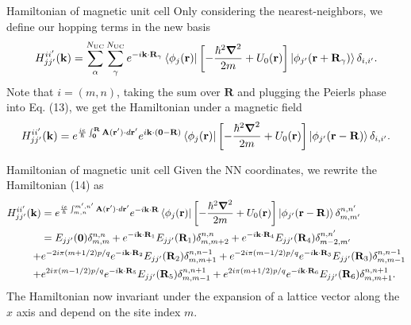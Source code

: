 \documentclass[aspectratio=169,compress,x11names]{beamer}
\begin{document}
	\begin{frame}{Hamiltonian of magnetic unit cell}
		Only considering the nearest-neighbors, we define our hopping terms in the new basis
		\begin{gather}
			H_{jj'}^{ii'}(\mathbf{k}) = \sum_{{\alpha}}^{N_\text{UC}}\sum_{{\gamma}}^{N_\text{UC}} e^{-i \mathbf{k}\cdot \mathbf{R}_{\gamma}} \bra{\phi_{j}(\mathbf{r})} \left[-\frac{\hbar^{2} \boldsymbol{\nabla}^{2}}{2m} + U_{0}(\mathbf{r})\right] \ket{\phi_{j'}(\mathbf{r}+\mathbf{R}_{\gamma})}\delta_{i,i'}.
		\end{gather}
		Note that $i=(m,n)$, taking the sum over $\mathbf{R}$ and plugging the Peierls phase into Eq. (13), we get the Hamiltonian under a magnetic field
		\begin{gather}
			H_{jj'}^{ii'}(\mathbf{k})
			= e^{\frac{ie}{\hbar} \int_{\mathbf{0}}^{\mathbf{R}}\mathbf{A}(\mathbf{r}')\cdot d\mathbf{r}'}e^{i\mathbf{k} \cdot (\mathbf{0} - \mathbf{R})} \bra{\phi_{j}(\mathbf{r})} \left[-\frac{\hbar^{2} \boldsymbol{\nabla}^{2}}{2m} + U_{0}(\mathbf{r})\right] \ket{\phi_{j'}(\mathbf{r} - \mathbf{R})}\delta_{i,i'} .
		\end{gather}
	\end{frame}
	\begin{frame}{Hamiltonian of magnetic unit cell}
		Given the NN coordinates, we rewrite the Hamiltonian (14) as
		\begin{equation}
			\begin{aligned}
				H_{jj'}^{ii'}(\mathbf{k}) 
				&= e^{\frac{ie}{\hbar} \int_{m,n}^{m',n'} \mathbf{A}(\mathbf{r}') \cdot d\mathbf{r}'} e^{-i\mathbf{k} \cdot \mathbf{R}}\bra{\phi_{j}(\mathbf{r})} \left[-\frac{\hbar^{2} \boldsymbol{\nabla}^{2}}{2m} + U_{0}(\mathbf{r})\right] \ket{\phi_{j'}(\mathbf{r} - \mathbf{R})}\delta_{m,m'}^{n,n'}\\
				& = E_{jj'}(\mathbf{0}) \delta_{m,m}^{n,n} + e^{-i\mathbf{k} \cdot \mathbf{R}_{1}}E_{jj'}(\mathbf{R}_{1}) \delta_{m,m+2}^{n,n} + e^{-i\mathbf{k} \cdot \mathbf{R}_{4}}E_{jj'}(\mathbf{R}_{4})  \delta_{m-2,m'}^{n,n'}            \\
				+& e^{-2i\pi(m + 1/2)p / q}e^{-i\mathbf{k} \cdot \mathbf{R}_{2}} E_{jj'}(\mathbf{R}_{2}) \delta_{m,m+1}^{n,n-1} + e^{-2i\pi(m - 1/2)p / q} e^{-i\mathbf{k} \cdot \mathbf{R}_{3}} E_{jj'}(\mathbf{R}_{3}) \delta_{m,m-1}^{n,n-1} \\
				+& e^{2i\pi(m - 1/2)p / q} e^{-i\mathbf{k} \cdot \mathbf{R}_{5}} E_{jj'}(\mathbf{R}_{5}) \delta_{m,m-1}^{n,n+1} + e^{2i\pi(m + 1/2)p / q} e^{-i\mathbf{k} \cdot \mathbf{R}_{6}} E_{jj'}(\mathbf{R}_{6}) \delta_{m,m+1}^{n,n+1}.
			\end{aligned}
		\end{equation}
		The Hamiltonian now invariant under the expansion of a lattice vector along the $x$ axis and depend on the site index $m$.
	\end{frame}
\end{document}
